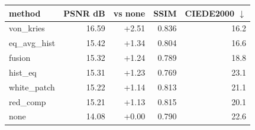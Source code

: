 \begin{tabular}{lrrrr}
\toprule
method & PSNR dB & vs none & SSIM & CIEDE2000 $\downarrow$ \\
\midrule
von\_kries & 16.59 & +2.51 & 0.836 & 16.2 \\
eq\_avg\_hist & 15.42 & +1.34 & 0.804 & 16.6 \\
fusion & 15.32 & +1.24 & 0.789 & 18.8 \\
hist\_eq & 15.31 & +1.23 & 0.769 & 23.1 \\
white\_patch & 15.22 & +1.14 & 0.813 & 21.1 \\
red\_comp & 15.21 & +1.13 & 0.815 & 20.1 \\
none & 14.08 & +0.00 & 0.790 & 22.6 \\
\bottomrule
\end{tabular}
